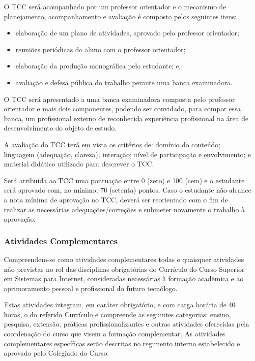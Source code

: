 O TCC será acompanhado por um professor orientador e o mecanismo de planejamento, acompanhamento e avaliação é composto pelos seguintes itens:
\begin{itemize}
	\item elaboração de um plano de atividades, aprovado pelo professor orientador;
	\item reuniões periódicas do aluno com o professor orientador;
	\item elaboração da produção monográfica pelo estudante; e,
	\item avaliação e defesa pública do trabalho perante uma banca examinadora.
\end{itemize}

O TCC será apresentado a uma banca examinadora composta pelo professor orientador e mais dois componentes, podendo ser convidado, para compor essa banca, um profissional externo de reconhecida experiência profissional na área de desenvolvimento do objeto de estudo.

A avaliação do TCC terá em vista os critérios de: domínio do conteúdo; linguagem (adequação, clareza); interação; nível de participação e envolvimento; e material didático utilizado para descrever o TCC.

Será atribuída ao TCC uma pontuação entre 0 (zero) e 100 (cem) e o estudante será aprovado com, no mínimo, 70 (setenta) pontos. Caso o estudante não alcance a nota mínima de aprovação no TCC, deverá ser reorientado com o fim de realizar as necessárias adequações/correções e submeter novamente o trabalho à aprovação.

\subsubsection{Atividades Complementares}

Compreendem-se como atividades complementares todas e quaisquer atividades não previstas no rol das disciplinas obrigatórias do Currículo do Curso Superior em Sistemas para Internet, consideradas necessárias à formação acadêmica e ao aprimoramento pessoal e profissional do futuro tecnólogo.

Estas atividades integram, em caráter obrigatório, e com carga horária de 40 horas, o do referido Currículo e compreende as seguintes categorias: ensino, pesquisa, extensão, práticas profissionalizantes e outras atividades oferecidas pela coordenação do curso que visem a formação complementar. As atividades complementares específicas serão descritas no regimento interno estabelecido e aprovado pelo Colegiado do Curso.

